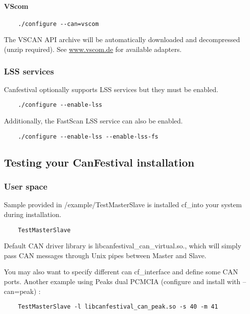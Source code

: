 \documentclass[12pt,english,a4paper]{book}
\begin{document}
\paragraph{VScom}
\begin{verbatim}
	./configure --can=vscom
\end{verbatim}
The VSCAN API archive will be automatically downloaded and decompressed (unzip required). See \href{http://www.vscom.de/1_1_05.htm}{www.vscom.de} for available adapters.

\subsubsection{LSS services}
Canfestival optionally supports LSS services but they must be enabled.
\begin{verbatim}
	./configure --enable-lss
\end{verbatim}

Additionally, the FastScan LSS service can also be enabled.
\begin{verbatim}
	./configure --enable-lss --enable-lss-fs
\end{verbatim}

\subsection{Testing your CanFestival installation}

\subsubsection{User space}

Sample provided in /example/TestMasterSlave is installed cf_into your
system during installation.


\begin{verbatim}
	TestMasterSlave
\end{verbatim}


Default CAN driver library is libcanfestival\_can\_virtual.so., which
will simply pass CAN messages through Unix pipes between Master and
Slave.

You may also want to specify different can cf_interface and define some
CAN ports. Another example using Peak{\textquotesingle}s dual PCMCIA
(configure and install with --can=peak) :


\begin{verbatim}
	TestMasterSlave -l libcanfestival_can_peak.so -s 40 -m 41
\end{verbatim}
\end{document}

